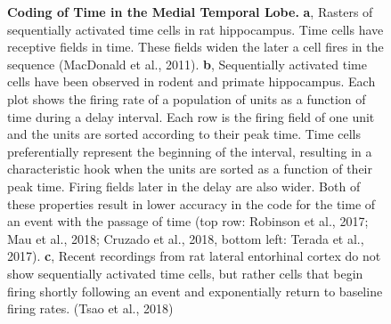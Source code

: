 \documentclass{apa}
\begin{document}
\begin{figure}
\begin{minipage}{\linewidth}
\begin{minipage}{.51\linewidth}
\begin{minipage}{\linewidth}
\begin{center}
				\end{center}
			\end{minipage}
		\end{minipage}
	\end{minipage}
	\caption{
		\label{fig:TimeCellExamples} 
		\textbf{Coding of Time in the Medial Temporal Lobe.} \textbf{a},
		Rasters of sequentially activated time cells in rat hippocampus.  Time
		cells have receptive fields in time.  These fields widen the later a
		cell fires in the sequence (MacDonald et al., 2011). \textbf{b},
		Sequentially activated time cells have been observed in rodent and
		primate hippocampus. 
		Each plot shows the firing rate of a population of units as a function
		of time during a delay interval.  Each row is the firing field of one
		unit and the units are sorted according to their peak time.
		Time cells preferentially represent the beginning of the interval,
		resulting in a characteristic hook when the units are sorted as a
		function of their peak time. Firing fields later in the delay are
		also wider.  Both of these properties result in lower accuracy in the
		code for the time of an event with the passage of time (top row:
		Robinson et al., 2017; Mau et al., 2018; Cruzado et al., 2018, bottom
		left:  Terada et al., 2017).  
		\textbf{c}, Recent recordings from rat lateral entorhinal cortex do
		not show sequentially activated time cells, but rather cells that
		begin firing shortly following an event and exponentially return to
		baseline firing rates. (Tsao et al., 2018) 
	} 
\end{figure}

\nocite{MacDEtal11,RobiEtal17,TeraEtal17,MauEtal18,CruzEtal18,TsaoEtal18}
\end{document}
